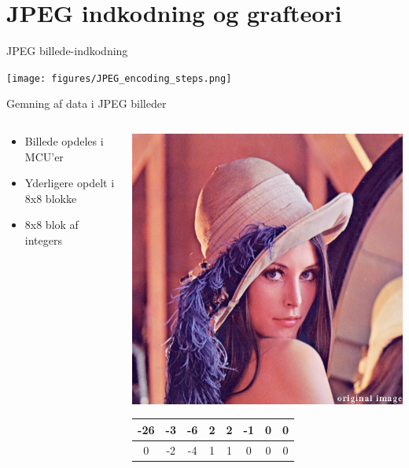 \section{JPEG indkodning og grafteori}

\begin{frame}{JPEG billede-indkodning}{}
	\begin{center}
		\texttt{[image: figures/JPEG\_encoding\_steps.png]}
	\end{center}
\end{frame}

\begin{frame}{Gemning af data i JPEG billeder}{}
	\begin{minipage}[0.5\textheight]{\textwidth}
		\begin{columns}[T]
			\begin{column}{0.5\textwidth}
				\vspace{.56mm}
				\begin{itemize}
					\item Billede opdeles i MCU'er
					\item Yderligere opdelt i 8x8 blokke
					\item 8x8 blok af integers
				\end{itemize}
			\end{column}
			\begin{column}{0.5\textwidth}
				\begin{center}
					\includegraphics[width=.5\textwidth]{figures/lena_color.jpg}
				\end{center}
				{\tiny \begin{table}[]
						\centering
						\begin{tabular}{|c|c|c|c|c|c|c|c|}
							\hline
							-26 & -3 & -6 & 2  & 2  & -1 & 0 & 0 \\ \hline
							0   & -2 & -4 & 1  & 1  & 0  & 0 & 0 \\ \hline

\end{tabular}
\end{table}}
\end{column}
\end{columns}
\end{minipage}
\end{frame}
